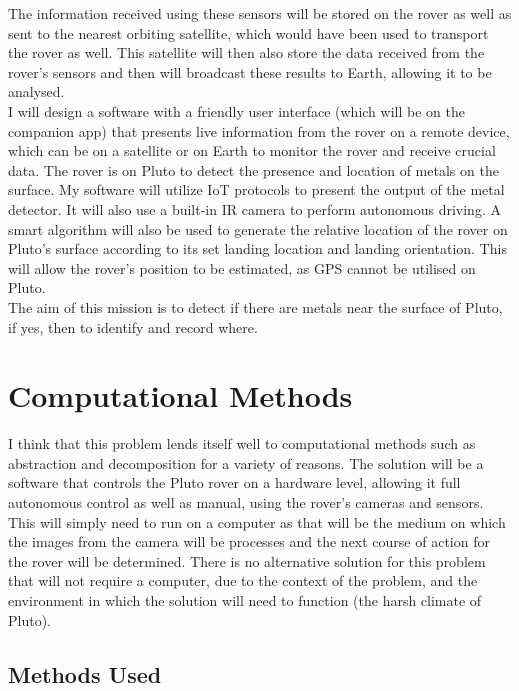 \documentclass[11pt]{report}
\begin{document}
The information received using these sensors will be stored on the rover as well as sent to the nearest orbiting satellite, which would have been used to transport the rover as well. This satellite will then also store the data received from the rover's sensors and then will broadcast these results to Earth, allowing it to be analysed.\\

I will design a software with a friendly user interface (which will be on the companion app) that presents live information from the rover on a remote device, which can be on a satellite or on Earth to monitor the rover and receive crucial data. The rover is on Pluto to detect the presence and location of metals on the surface. My software will utilize IoT protocols to present the output of the metal detector. It will also use a built-in IR camera to perform autonomous driving. A smart algorithm will also be used to generate the relative location of the rover on Pluto's surface according to its set landing location and landing orientation. This will allow the rover's position to be estimated, as GPS cannot be utilised on Pluto. \\
 
The aim of this mission is to detect if there are metals near the surface of Pluto, if yes, then to identify and record where.\\

\section{Computational Methods}

I think that this problem lends itself well to computational methods such as abstraction and decomposition for a variety of reasons. The solution will be a software that controls the Pluto rover on a hardware level, allowing it full autonomous control as well as manual, using the rover's cameras and sensors. This will simply need to run on a computer as that will be the medium on which the images from the camera will be processes and the next course of action for the rover will be determined. There is no alternative solution for this problem that will not require a computer, due to the context of the problem, and the environment in which the solution will need to function (the harsh climate of Pluto).

\subsection{Methods Used}
\end{document}

